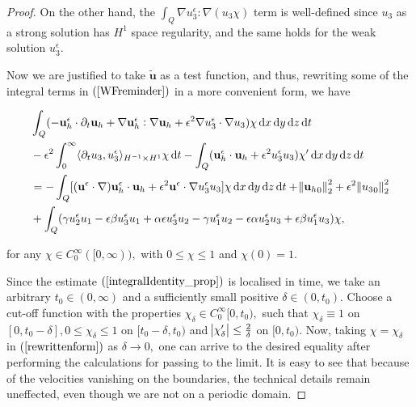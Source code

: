 \documentclass[11pt]{article}
\newcommand*\diff{\mathop{}\!\mathrm{d}}
\begin{document}
\begin{proof}
On the other hand, the $ \int_Q \nabla u^\epsilon_3 : \nabla (u_3 \chi) $ term is well-defined since $u_3$ as a strong solution has $H^1$ space regularity, and the same holds for the weak solution $u^\epsilon_3.$

Now we are justified to take $\tilde{\mathbf{u}}$ as a test function, and thus, rewriting some of the integral terms in $(\ref{WFreminder})$ in a more convenient form, we have

\begin{equation} \label{rewrittenform}
  \begin{split}
    & \int_Q (- \mathbf{u}_h^\epsilon \cdot \partial_t \mathbf{u}_h + \nabla \mathbf{u}_h^\epsilon : \nabla \mathbf{u}_h + \epsilon^2 \nabla u_3^\epsilon \cdot \nabla u_3) \chi \diff x \diff y \diff z \diff t \\
    & - \epsilon^2 \int_0^\infty \langle \partial_t u_3 , u_3^\epsilon \rangle _{H^{-1} \times H^1} \chi \diff t - \int_Q (\mathbf{u}_h^\epsilon \cdot \mathbf{u}_h + \epsilon^2 u_3^\epsilon u_3) \chi' \diff x \diff y \diff z \diff t \\
    & = - \int_Q [(\mathbf{u}^\epsilon \cdot \nabla) \mathbf{u}_h^\epsilon \cdot \mathbf{u}_h + \epsilon^2 \mathbf{u}^\epsilon \cdot \nabla u_3^\epsilon u_3] \chi \diff x \diff y \diff z \diff t + \norm{{\mathbf{u}_h}_0}_2^2 + \epsilon^2 \norm{{u_3}_0}_2^2 \\
    & + \int_Q  ( \gamma u_2^\epsilon u_1 - \epsilon \beta u_3^\epsilon u_1 + \alpha \epsilon u_3^\epsilon u_2 - \gamma u_1^\epsilon u_2 - \epsilon \alpha u^\epsilon_2 u_3 + \epsilon \beta u_1^\epsilon u_3) \chi,\raisetag{80pt}
  \end{split}
\end{equation}

for any $\chi \in C^\infty_0 ([0,\infty)),$ with $0 \leq \chi \leq 1$ and $\chi (0) = 1.$

Since the estimate $(\ref{integralIdentity_prop})$ is localised in time, we take an arbitrary $t_0 \in (0, \infty)$ and a sufficiently small positive $\delta \in (0, t_0).$ Choose a cut-off function with the properties $\chi_\delta \in C^\infty_0 [0,t_0),$ such that $\chi_\delta \equiv 1$ on $[0, t_0 -\delta], 0 \leq \chi_\delta \leq 1$ on $[t_0 - \delta, t_0 )$ and $\abs{\chi_\delta '} \leq \frac{2}{\delta}$ on $[0, t_0).$ Now, taking $\chi = \chi_\delta$ in $(\ref{rewrittenform})$ as $\delta \to 0,$ one can arrive to the desired equality after performing the calculations for passing to the limit. It is easy to see that because of the velocities vanishing on the boundaries, the technical details remain uneffected, even though we are not on a periodic domain.


\end{proof}
\end{document}
